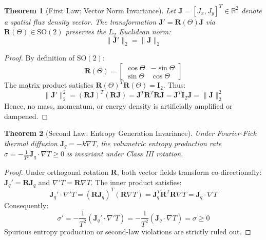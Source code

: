 \documentclass[10pt,journal,compsoc]{IEEEtran}
\newtheorem{theorem}{Theorem}
\begin{document}
\begin{theorem}[First Law: Vector Norm Invariance]
Let $\mathbf{J} = [J_x, J_y]^T \in \mathbb{R}^2$ denote a spatial flux density vector. The transformation $\mathbf{J}' = \mathbf{R}(\Theta)\mathbf{J}$ via $\mathbf{R}(\Theta) \in \mathrm{SO}(2)$ preserves the $L_2$ Euclidean norm:
\begin{equation}
    \|\mathbf{J}'\|_2 = \|\mathbf{J}\|_2
\end{equation}
\end{theorem}
\begin{proof}
By definition of $\mathrm{SO}(2)$:
\begin{equation}
    \mathbf{R}(\Theta) = \begin{bmatrix} \cos\Theta & -\sin\Theta \\ \sin\Theta & \cos\Theta \end{bmatrix}
\end{equation}
The matrix product satisfies $\mathbf{R}(\Theta)^T \mathbf{R}(\Theta) = \mathbf{I}_2$. Thus:
\begin{equation}
    \|\mathbf{J}'\|_2^2 = (\mathbf{R}\mathbf{J})^T(\mathbf{R}\mathbf{J}) = \mathbf{J}^T \mathbf{R}^T \mathbf{R} \mathbf{J} = \mathbf{J}^T \mathbf{I}_2 \mathbf{J} = \|\mathbf{J}\|_2^2
\end{equation}
Hence, no mass, momentum, or energy density is artificially amplified or dampened.
\end{proof}

\begin{theorem}[Second Law: Entropy Generation Invariance]
Under Fourier-Fick thermal diffusion $\mathbf{J}_q = -k \nabla T$, the volumetric entropy production rate $\sigma = -\frac{1}{T^2} \mathbf{J}_q \cdot \nabla T \ge 0$ is invariant under Class III rotation.
\end{theorem}
\begin{proof}
Under orthogonal rotation $\mathbf{R}$, both vector fields transform co-directionally: $\mathbf{J}_q' = \mathbf{R}\mathbf{J}_q$ and $\nabla' T = \mathbf{R}\nabla T$. The inner product satisfies:
\begin{equation}
    \mathbf{J}_q' \cdot \nabla' T = (\mathbf{R}\mathbf{J}_q)^T (\mathbf{R}\nabla T) = \mathbf{J}_q^T \mathbf{R}^T \mathbf{R} \nabla T = \mathbf{J}_q \cdot \nabla T
\end{equation}
Consequently:
\begin{equation}
    \sigma' = -\frac{1}{T^2} (\mathbf{J}_q' \cdot \nabla' T) = -\frac{1}{T^2} (\mathbf{J}_q \cdot \nabla T) = \sigma \ge 0
\end{equation}
Spurious entropy production or second-law violations are strictly ruled out.
\end{proof}
\end{document}
